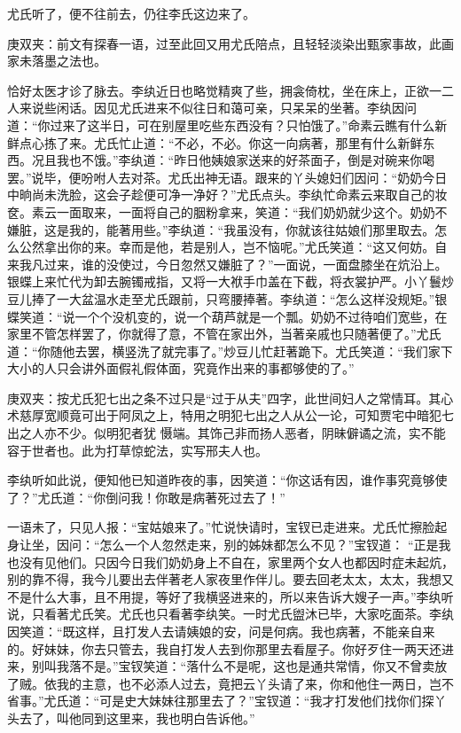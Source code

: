 \begin{parag}
    尤氏听了，便不往前去，仍往李氏这边来了。\begin{note}庚双夹：前文有探春一语，过至此回又用尤氏陪点，且轻轻淡染出甄家事故，此画家未落墨之法也。\end{note}恰好太医才诊了脉去。李纨近日也略觉精爽了些，拥衾倚枕，坐在床上，正欲一二人来说些闲话。因见尤氏进来不似往日和蔼可亲，只呆呆的坐著。李纨因问道：“你过来了这半日，可在别屋里吃些东西没有？只怕饿了。”命素云瞧有什么新鲜点心拣了来。尤氏忙止道：“不必，不必。你这一向病著，那里有什么新鲜东西。况且我也不饿。”李纨道：“昨日他姨娘家送来的好茶面子，倒是对碗来你喝罢。”说毕，便吩咐人去对茶。尤氏出神无语。跟来的丫头媳妇们因问：“奶奶今日中晌尚未洗脸，这会子趁便可净一净好？”尤氏点头。李纨忙命素云来取自己的妆奁。素云一面取来，一面将自己的胭粉拿来，笑道：“我们奶奶就少这个。奶奶不嫌脏，这是我的，能著用些。”李纨道：“我虽没有，你就该往姑娘们那里取去。怎么公然拿出你的来。幸而是他，若是别人，岂不恼呢。”尤氏笑道：“这又何妨。自来我凡过来，谁的没使过，今日忽然又嫌脏了？”一面说，一面盘膝坐在炕沿上。银蝶上来忙代为卸去腕镯戒指，又将一大袱手巾盖在下截，将衣裳护严。小丫鬟炒豆儿捧了一大盆温水走至尤氏跟前，只弯腰捧著。李纨道：“怎么这样没规矩。”银蝶笑道：“说一个个没机变的，说一个葫芦就是一个瓢。奶奶不过待咱们宽些，在家里不管怎样罢了，你就得了意，不管在家出外，当著亲戚也只随著便了。”尤氏道：“你随他去罢，横竖洗了就完事了。”炒豆儿忙赶著跪下。尤氏笑道：“我们家下大小的人只会讲外面假礼假体面，究竟作出来的事都够使的了。”\begin{note}庚双夹：按尤氏犯七出之条不过只是“过于从夫”四字，此世间妇人之常情耳。其心术慈厚宽顺竟可出于阿凤之上，特用之明犯七出之人从公一论，可知贾宅中暗犯七出之人亦不少。似明犯者犹 慑端。其饰己非而扬人恶者，阴昧僻谲之流，实不能容于世者也。此为打草惊蛇法，实写邢夫人也。\end{note}李纨听如此说，便知他已知道昨夜的事，因笑道：“你这话有因，谁作事究竟够使了？”尤氏道：“你倒问我！你敢是病著死过去了！”
\end{parag}


\begin{parag}
    一语未了，只见人报：“宝姑娘来了。”忙说快请时，宝钗已走进来。尤氏忙擦脸起身让坐，因问：“怎么一个人忽然走来，别的姊妹都怎么不见？”宝钗道： “正是我也没有见他们。只因今日我们奶奶身上不自在，家里两个女人也都因时症未起炕，别的靠不得，我今儿要出去伴著老人家夜里作伴儿。要去回老太太，太太，我想又不是什么大事，且不用提，等好了我横竖进来的，所以来告诉大嫂子一声。”李纨听说，只看著尤氏笑。尤氏也只看著李纨笑。一时尤氏盥沐已毕，大家吃面茶。李纨因笑道：“既这样，且打发人去请姨娘的安，问是何病。我也病著，不能亲自来的。好妹妹，你去只管去，我自打发人去到你那里去看屋子。你好歹住一两天还进来，别叫我落不是。”宝钗笑道：“落什么不是呢，这也是通共常情，你又不曾卖放了贼。依我的主意，也不必添人过去，竟把云丫头请了来，你和他住一两日，岂不省事。”尤氏道：“可是史大妹妹往那里去了？”宝钗道：“我才打发他们找你们探丫头去了，叫他同到这里来，我也明白告诉他。”
\end{parag}


